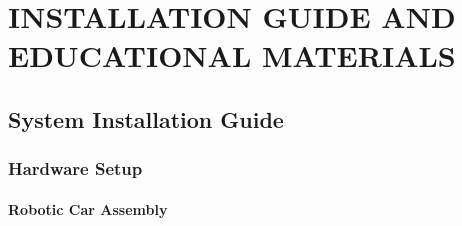 \chapter{INSTALLATION GUIDE AND EDUCATIONAL MATERIALS}

\section{System Installation Guide}

\subsection{Hardware Setup}

\subsubsection{Robotic Car Assembly}

